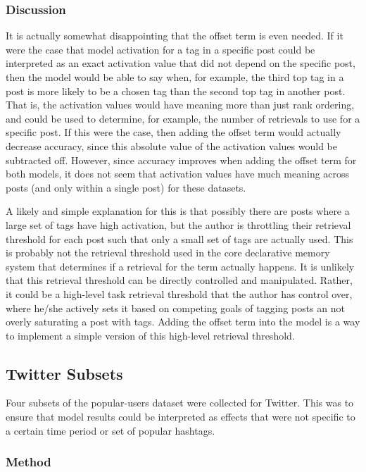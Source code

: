 \documentclass[man,floatsintext,donotrepeattitle]{apa6}
\begin{document}
\subsubsection{Discussion}

It is actually somewhat disappointing that the offset term is even needed.
If it were the case that model activation for a tag in a specific post could be interpreted as an exact activation value that did not depend on the specific post,
then the model would be able to say when, for example, the third top tag in a post is more likely to be a chosen tag than the second top tag in another post.
That is, the activation values would have meaning more than just rank ordering, and could be used to determine, for example, the number of retrievals to use for a specific post.
If this were the case, then adding the offset term would actually decrease accuracy, since this absolute value of the activation values would be subtracted off.
However, since accuracy improves when adding the offset term for both models, it does not seem that activation values have much meaning across posts (and only within a single post) for these datasets.

A likely and simple explanation for this is that possibly there are posts where a large set of tags have high activation,
but the author is throttling their retrieval threshold for each post such that only a small set of tags are actually used.
This is probably not the retrieval threshold used in the core declarative memory system that determines if a retrieval for the term actually happens.
It is unlikely that this retrieval threshold can be directly controlled and manipulated.
Rather, it could be a high-level task retrieval threshold that the author has control over, where he/she actively sets it based on competing goals of tagging posts an not overly saturating a post with tags.
Adding the offset term into the model is a way to implement a simple version of this high-level retrieval threshold.

\subsection{Twitter Subsets}

Four subsets of the popular-users dataset were collected for Twitter.
This was to ensure that model results could be interpreted as effects that were not specific to a certain time period or set of popular hashtags.

\subsubsection{Method}
\end{document}
